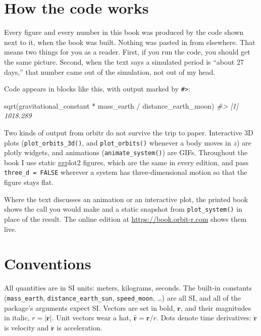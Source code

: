 \documentclass[
  10.5pt,
  letterpaper,
]{scrbook}
\newenvironment{Shaded}{\begin{snugshade}}{\end{snugshade}}
\newcommand{\CommentTok}[1]{\textcolor[rgb]{0.00,0.00,0.00}{\textit{#1}}}
\newcommand{\FunctionTok}[1]{\textcolor[rgb]{0.00,0.00,0.00}{#1}}
\newcommand{\NormalTok}[1]{\textcolor[rgb]{0.00,0.00,0.00}{#1}}
\newcommand{\SpecialCharTok}[1]{\textcolor[rgb]{0.00,0.00,0.00}{#1}}
\theoremstyle{plain}
\theoremstyle{remark}
\begin{document}
\section*{How the code works}\label{how-the-code-works}


Every figure and every number in this book was produced by the code
shown next to it, when the book was built. Nothing was pasted in from
elsewhere. That means two things for you as a reader. First, if you run
the code, you should get the same picture. Second, when the text says a
simulated period is ``about 27 days,'' that number came out of the
simulation, not out of my head.

Code appears in blocks like this, with output marked by
\texttt{\#\textgreater{}}:

\begin{Shaded}
\begin{Highlighting}[]
\FunctionTok{sqrt}\NormalTok{(gravitational\_constant }\SpecialCharTok{*}\NormalTok{ mass\_earth }\SpecialCharTok{/}\NormalTok{ distance\_earth\_moon)}
\CommentTok{\#\textgreater{} [1] 1018.289}
\end{Highlighting}
\end{Shaded}

Two kinds of output from orbitr do not survive the trip to paper.
Interactive 3D plots (\texttt{plot\_orbits\_3d()}, and
\texttt{plot\_orbits()} whenever a body moves in \(z\)) are plotly
widgets, and animations (\texttt{animate\_system()}) are GIFs.
Throughout the book I use static ggplot2 figures, which are the same in
every edition, and pass \texttt{three\_d\ =\ FALSE} wherever a system
has three-dimensional motion so that the figure stays flat.

Where the text discusses an animation or an interactive plot, the
printed book shows the call you would make and a static snapshot from
\texttt{plot\_system()} in place of the result. The online edition at
\url{https://book.orbit-r.com} shows them live.

\section*{Conventions}\label{conventions}


All quantities are in SI units: meters, kilograms, seconds. The built-in
constants (\texttt{mass\_earth}, \texttt{distance\_earth\_sun},
\texttt{speed\_moon}, \ldots) are all SI, and all of the package's
arguments expect SI. Vectors are set in bold, \(\mathbf{r}\), and their
magnitudes in italic, \(r = |\mathbf{r}|\). Unit vectors wear a hat,
\(\hat{\mathbf{r}} = \mathbf{r}/r\). Dots denote time derivatives:
\(\dot{\mathbf{r}}\) is velocity and \(\ddot{\mathbf{r}}\) is
acceleration.
\end{document}
